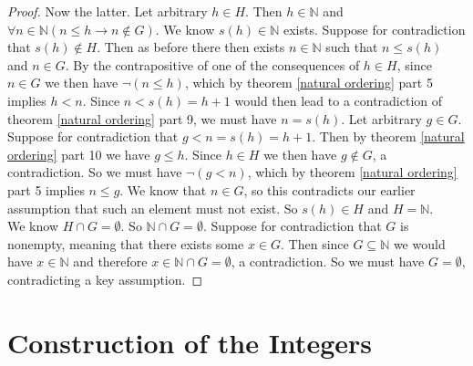 \documentclass{report}
\begin{document}
\begin{proof}
\indent Now the latter. Let arbitrary $h\in H$. Then $h\in\mathbb N$ and $\forall n\in\mathbb N(n\leq h\to n\notin G)$. We know $s(h)\in\mathbb N$ exists. Suppose for contradiction that 
$s(h)\notin H$. Then as before there then exists $n\in\mathbb N$ such that $n\leq s(h)$ and $n\in G$. By the contrapositive of one of the consequences
of $h\in H$, since $n\in G$ we then have $\neg(n\leq h)$,
which by theorem \ref{natural ordering} part 5 implies $h<n$. Since $n<s(h)=h+1$ would then lead to a contradiction of theorem \ref{natural ordering} part 9, we must have $n=s(h)$.
Let arbitrary $g\in G$. Suppose for contradiction that $g<n=s(h)=h+1$. Then by theorem \ref{natural ordering} part 10 we have $g\leq h$. Since $h\in H$ we then have $g\notin G$, a contradiction.
So we must have $\neg(g<n)$, which by theorem \ref{natural ordering} part 5 implies $n\leq g$.
We know that $n\in G$, so this contradicts our earlier assumption that such an element must not exist. So $s(h)\in H$ and $H=\mathbb N$.\\
\indent We know $H\cap G=\emptyset$. So $\mathbb N\cap G=\emptyset$. Suppose for contradiction that $G$ is nonempty, meaning that there exists some $x\in G$. 
Then since $G\subseteq\mathbb N$ we would have $x\in\mathbb N$ and 
therefore $x\in\mathbb N\cap G=\emptyset$, a contradiction. So we must have $G=\emptyset$, contradicting a key assumption.
\end{proof}
\newpage

\section{Construction of the Integers}
\end{document}
